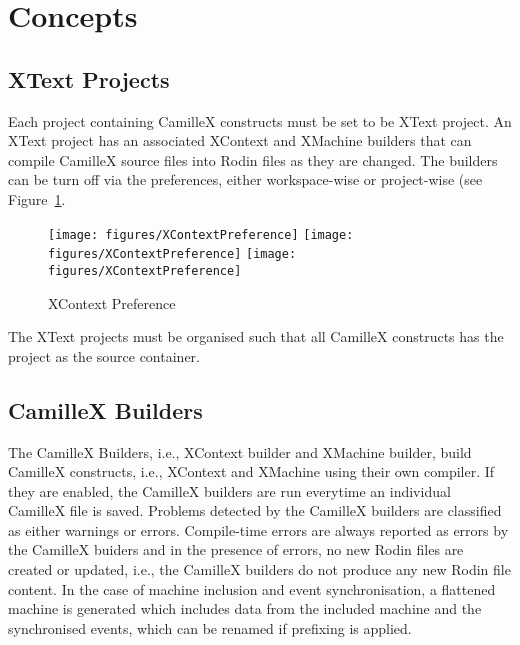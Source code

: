 \section{Concepts}
\label{sec:concepts}

\subsection{XText Projects}
\label{sec:xtext-projects}

Each project containing CamilleX constructs must be set to be XText project.  An XText project has an associated XContext and XMachine builders that can compile CamilleX source files into Rodin files as they are changed.  The builders can be turn off via the preferences, either workspace-wise or project-wise (see Figure~\ref{fig:XContextPreference}.
\begin{figure}[!htbp]
  \centering
  \texttt{[image: figures/XContextPreference]}
  \endif
  \texttt{[image: figures/XContextPreference]}
  \endif
  \texttt{[image: figures/XContextPreference]}
  \endif
  \caption{XContext Preference}
  \label{fig:XContextPreference}
\end{figure}

The XText projects must be organised such that all CamilleX constructs has the project as the source container.

\subsection{CamilleX Builders}
\label{sec:xevent-b-builders}
The CamilleX Builders, i.e., XContext builder and XMachine builder, build CamilleX constructs, i.e., XContext and XMachine using their own compiler.  If they are enabled, the CamilleX builders are run everytime an individual CamilleX file is saved.  Problems detected by the CamilleX builders are classified as either warnings or errors.  Compile-time errors are always reported as errors by the CamilleX buiders and in the presence of errors, no new Rodin files are created or updated, i.e., the CamilleX builders do not produce any new Rodin file content. In the case of machine inclusion and event synchronisation, a flattened machine is generated which includes data from the included machine and the synchronised events, which can be renamed if prefixing is applied.

